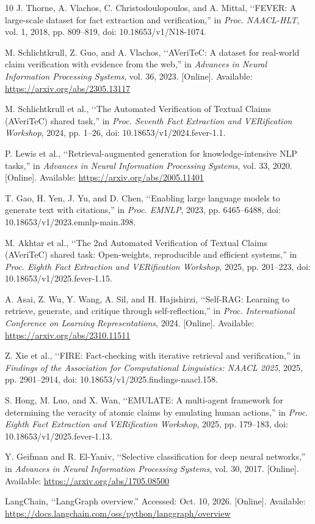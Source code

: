 \documentclass[conference]{IEEEtran}
\begin{document}
\begin{thebibliography}{10}
J. Thorne, A. Vlachos, C. Christodoulopoulos, and A. Mittal, \lq\lq FEVER: A large-scale dataset for fact extraction and verification,'' in \emph{Proc. NAACL-HLT}, vol. 1, 2018, pp. 809--819, doi: 10.18653/v1/N18-1074.

M. Schlichtkrull, Z. Guo, and A. Vlachos, \lq\lq AVeriTeC: A dataset for real-world claim verification with evidence from the web,'' in \emph{Advances in Neural Information Processing Systems}, vol. 36, 2023. [Online]. Available: \url{https://arxiv.org/abs/2305.13117}

M. Schlichtkrull et al., \lq\lq The Automated Verification of Textual Claims (AVeriTeC) shared task,'' in \emph{Proc. Seventh Fact Extraction and VERification Workshop}, 2024, pp. 1--26, doi: 10.18653/v1/2024.fever-1.1.

P. Lewis et al., \lq\lq Retrieval-augmented generation for knowledge-intensive NLP tasks,'' in \emph{Advances in Neural Information Processing Systems}, vol. 33, 2020. [Online]. Available: \url{https://arxiv.org/abs/2005.11401}

T. Gao, H. Yen, J. Yu, and D. Chen, \lq\lq Enabling large language models to generate text with citations,'' in \emph{Proc. EMNLP}, 2023, pp. 6465--6488, doi: 10.18653/v1/2023.emnlp-main.398.

M. Akhtar et al., \lq\lq The 2nd Automated Verification of Textual Claims (AVeriTeC) shared task: Open-weights, reproducible and efficient systems,'' in \emph{Proc. Eighth Fact Extraction and VERification Workshop}, 2025, pp. 201--223, doi: 10.18653/v1/2025.fever-1.15.

A. Asai, Z. Wu, Y. Wang, A. Sil, and H. Hajishirzi, \lq\lq Self-RAG: Learning to retrieve, generate, and critique through self-reflection,'' in \emph{Proc. International Conference on Learning Representations}, 2024. [Online]. Available: \url{https://arxiv.org/abs/2310.11511}

Z. Xie et al., \lq\lq FIRE: Fact-checking with iterative retrieval and verification,'' in \emph{Findings of the Association for Computational Linguistics: NAACL 2025}, 2025, pp. 2901--2914, doi: 10.18653/v1/2025.findings-naacl.158.

S. Hong, M. Luo, and X. Wan, \lq\lq EMULATE: A multi-agent framework for determining the veracity of atomic claims by emulating human actions,'' in \emph{Proc. Eighth Fact Extraction and VERification Workshop}, 2025, pp. 179--183, doi: 10.18653/v1/2025.fever-1.13.

Y. Geifman and R. El-Yaniv, \lq\lq Selective classification for deep neural networks,'' in \emph{Advances in Neural Information Processing Systems}, vol. 30, 2017. [Online]. Available: \url{https://arxiv.org/abs/1705.08500}

LangChain, \lq\lq LangGraph overview.'' Accessed: Oct. 10, 2026. [Online]. Available: \url{https://docs.langchain.com/oss/python/langgraph/overview}
\end{thebibliography}
\end{document}
